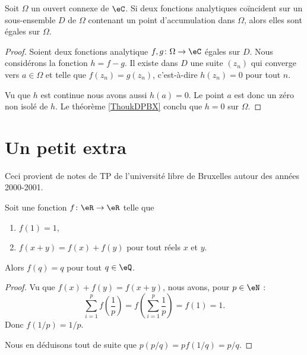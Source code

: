 \begin{theorem}\label{ThoAVBCewB}
	Soit \( \Omega\) un ouvert connexe de \( \eC\). Si deux fonctions analytiques coïncident sur un sous-ensemble \( D\) de \( \Omega\) contenant un point d'accumulation dans \( \Omega\), alors elles sont égales sur \( \Omega\).
\end{theorem}

\begin{proof}
	Soient deux fonctions analytique \( f,g\colon \Omega\to \eC\) égales sur \( D\). Nous considérons la fonction \( h=f-g\). Il existe dans \( D\) une suite \( (z_n)\) qui converge vers \( a\in \Omega\) et telle que \( f(z_n)=g(z_n)\), c'est-à-dire \( h(z_n)=0\) pour tout \( n\).

	Vu que \( h\) est continue nous avons aussi \( h(a)=0\). Le point \( a\) est donc un zéro non isolé de \( h\). Le théorème \ref{ThoukDPBX} conclu que \( h=0\) sur \( \Omega\).
\end{proof}

\section{Un petit extra}

Ceci provient de notes de TP de l'université libre de Bruxelles autour des années 2000-2001\cite{BIBooFYVSooNIiApF}.

\begin{lemma}        \label{LEMooXRMAooRADhOM}
	Soit une fonction \( f\colon \eR\to \eR\) telle que
	\begin{enumerate}

		\item		\label{ItemExtrai}
		      \( f(1)=1\),

		\item		\label{ItemExtraii}
		      \( f(x+y)=f(x)+f(y)\) pour tout réels \( x\) et \( y\).
	\end{enumerate}
	Alors \( f(q)=q\) pour tout \( q\in \eQ\).
\end{lemma}

\begin{proof}
	Vu que \( f(x)+f(y)=f(x+y)\), nous avons, pour \( p\in \eN\) :
	\begin{equation}
		\sum_{i=1}^pf(\frac{1}{ p })=f(\sum_{i=1}^p\frac{1}{ p })=f(1)=1.
	\end{equation}
	Donc \( f(1/p)=1/p\).

	Nous en déduisons tout de suite que \( p(p/q)=pf(1/q)=p/q\).
\end{proof}


